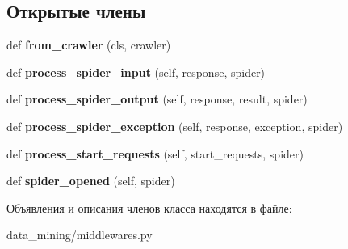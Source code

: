 \subsection*{Открытые члены}
\begin{DoxyCompactItemize}
\item 
\mbox{\label{classdata__mining_1_1middlewares_1_1DataMiningSpiderMiddleware_a4a5c85f3c30c3c946f3c74ae13c94c3a}} 
def {\bfseries from\+\_\+crawler} (cls, crawler)
\item 
\mbox{\label{classdata__mining_1_1middlewares_1_1DataMiningSpiderMiddleware_a1c6196eb9c3f423043e6cb20fee1236b}} 
def {\bfseries process\+\_\+spider\+\_\+input} (self, response, spider)
\item 
\mbox{\label{classdata__mining_1_1middlewares_1_1DataMiningSpiderMiddleware_a276abed61b2054fd7dafd2a663d56dd2}} 
def {\bfseries process\+\_\+spider\+\_\+output} (self, response, result, spider)
\item 
\mbox{\label{classdata__mining_1_1middlewares_1_1DataMiningSpiderMiddleware_aa29fa4d79fc8680160024bbedcccb111}} 
def {\bfseries process\+\_\+spider\+\_\+exception} (self, response, exception, spider)
\item 
\mbox{\label{classdata__mining_1_1middlewares_1_1DataMiningSpiderMiddleware_a0b90937642bc145ff4848907da390921}} 
def {\bfseries process\+\_\+start\+\_\+requests} (self, start\+\_\+requests, spider)
\item 
\mbox{\label{classdata__mining_1_1middlewares_1_1DataMiningSpiderMiddleware_affd9c588d0747aded03fe46c6a35db01}} 
def {\bfseries spider\+\_\+opened} (self, spider)
\end{DoxyCompactItemize}


Объявления и описания членов класса находятся в файле\+:\begin{DoxyCompactItemize}
\item 
data\+\_\+mining/middlewares.\+py\end{DoxyCompactItemize}

